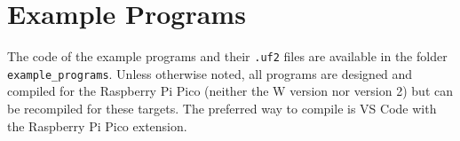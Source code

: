 \documentclass[a4paper,11pt]{article}
\begin{document}
\section*{Example Programs}

The code of the example programs and their \texttt{.uf2} files are available in the folder \texttt{example\_programs}. Unless otherwise noted, all programs are designed and compiled for the Raspberry Pi Pico (neither the W version nor version 2) but can be recompiled for these targets. The preferred way to compile is VS Code with the Raspberry Pi Pico extension.
\end{document}
